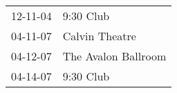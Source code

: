 \begin{supertabular}{p{0.07\textwidth}p{0.23\textwidth}}
 12-11-04 &            9:30 Club \\
 04-11-07 &       Calvin Theatre \\
 04-12-07 &  The Avalon Ballroom \\
 04-14-07 &            9:30 Club \\
\end{supertabular}
